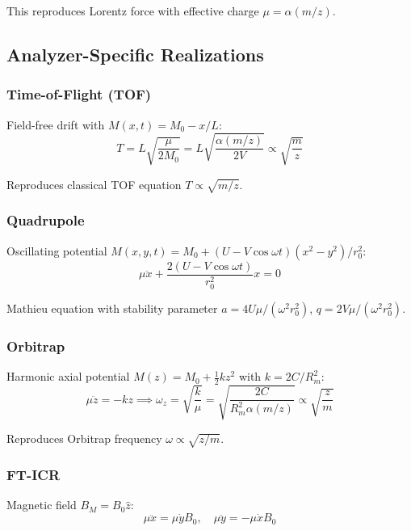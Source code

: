 \documentclass[twocolumn,aps,prl,superscriptaddress,floatfix]{revtex4-2}
\begin{document}
This reproduces Lorentz force with effective charge $\mu = \alpha(m/z)$.

\subsection{Analyzer-Specific Realizations}

\subsubsection{Time-of-Flight (TOF)}

Field-free drift with $M(x,t) = M_0 - x/L$:
\begin{equation}
T = L\sqrt{\frac{\mu}{2M_0}} = L\sqrt{\frac{\alpha(m/z)}{2V}} \propto \sqrt{\frac{m}{z}}
\end{equation}

Reproduces classical TOF equation $T \propto \sqrt{m/z}$.

\subsubsection{Quadrupole}

Oscillating potential $M(x,y,t) = M_0 + (U - V\cos\omega t)(x^2 - y^2)/r_0^2$:
\begin{equation}
\mu \ddot{x} + \frac{2(U - V\cos\omega t)}{r_0^2}x = 0
\end{equation}

Mathieu equation with stability parameter $a = 4U\mu/(\omega^2 r_0^2)$, $q = 2V\mu/(\omega^2 r_0^2)$.

\subsubsection{Orbitrap}

Harmonic axial potential $M(z) = M_0 + \frac{1}{2}k z^2$ with $k = 2C/R_m^2$:
\begin{equation}
\mu \ddot{z} = -k z \implies \omega_z = \sqrt{\frac{k}{\mu}} = \sqrt{\frac{2C}{R_m^2 \alpha(m/z)}} \propto \sqrt{\frac{z}{m}}
\end{equation}

Reproduces Orbitrap frequency $\omega \propto \sqrt{z/m}$.

\subsubsection{FT-ICR}

Magnetic field $B_M = B_0 \hat{z}$:
\begin{equation}
\mu \ddot{x} = \mu \dot{y} B_0, \quad \mu \ddot{y} = -\mu \dot{x} B_0
\end{equation}
\end{document}
